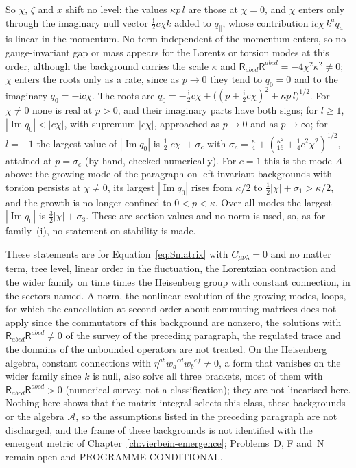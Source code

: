 So \(\chi\), \(\zeta\) and \(x\) shift no level: the values \(\kappa p\,l\) are those at \(\chi=0\), and \(\chi\) enters only through the imaginary null vector \(\tfrac{\mathrm i}2c\chi k\) added to \(q_\parallel\), whose contribution \(\mathrm ic\chi\,k^aq_a\) is linear in the momentum. No term independent of the momentum enters, so no gauge-invariant gap or mass appears for the Lorentz or torsion modes at this order, although the background carries the scale \(\kappa\) and \(\mathsf R_{abcd}\mathsf R^{abcd}=-4\chi^2\kappa^2\neq0\); \(\chi\) enters the roots only as a rate, since as \(p\to0\) they tend to \(q_0=0\) and to the imaginary \(q_0=-\mathrm ic\chi\). The roots are \(q_0=-\tfrac{\mathrm i}2c\chi\pm\bigl((p+\tfrac{\mathrm i}2c\chi)^2+\kappa p\,l\bigr)^{1/2}\). For \(\chi\neq0\) none is real at \(p>0\), and their imaginary parts have both signs; for \(l\ge1\), \(|\operatorname{Im}q_0|<|c\chi|\), with supremum \(|c\chi|\), approached as \(p\to0\) and as \(p\to\infty\); for \(l=-1\) the largest value of \(|\operatorname{Im}q_0|\) is \(\tfrac12|c\chi|+\sigma_c\) with \(\sigma_c=\tfrac\kappa4+(\tfrac{\kappa^2}{16}+\tfrac14c^2\chi^2)^{1/2}\), attained at \(p=\sigma_c\) (by hand, checked numerically). For \(c=1\) this is the mode \(A\) above: the growing mode of the paragraph on left-invariant backgrounds with torsion persists at \(\chi\neq0\), its largest \(|\operatorname{Im}q_0|\) rises from \(\kappa/2\) to \(\tfrac12|\chi|+\sigma_1>\kappa/2\), and the growth is no longer confined to \(0<p<\kappa\). Over all modes the largest \(|\operatorname{Im}q_0|\) is \(\tfrac32|\chi|+\sigma_3\). These are section values and no norm is used, so, as for family~(i), no statement on stability is made.

These statements are for Equation~\eqref{eq:Smatrix} with \(C_{\mu\nu\lambda}=0\) and no matter term, tree level, linear order in the fluctuation, the Lorentzian contraction and the wider family on time times the Heisenberg group with constant connection, in the sectors named. A norm, the nonlinear evolution of the growing modes, loops, for which the cancellation at second order about commuting matrices does not apply since the commutators of this background are nonzero, the solutions with \(\mathsf R_{abcd}\mathsf R^{abcd}\neq0\) of the survey of the preceding paragraph, the regulated trace and the domains of the unbounded operators are not treated. On the Heisenberg algebra, constant connections with \(\eta^{ab}w_a{}^{cd}w_b{}^{ef}\neq0\), a form that vanishes on the wider family since \(k\) is null, also solve all three brackets, most of them with \(\mathsf R_{abcd}\mathsf R^{abcd}>0\) (numerical survey, not a classification); they are not linearised here. Nothing here shows that the matrix integral selects this class, these backgrounds or the algebra \(\mathcal A\), so the assumptions listed in the preceding paragraph are not discharged, and the frame of these backgrounds is not identified with the emergent metric of Chapter~\ref{ch:vierbein-emergence}; Problems~D, F and~N remain open and PROGRAMME-CONDITIONAL.

